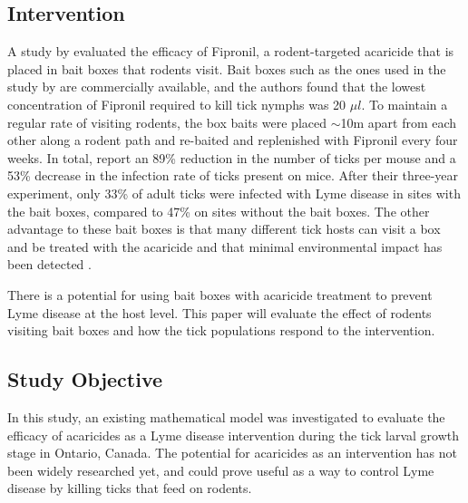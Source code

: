 \documentclass[12pt, centerh1]{article}
\begin{document}
\subsection{Intervention}

A study by \citet{dolan2004control} evaluated the efficacy of Fipronil, a rodent-targeted acaricide that is placed in bait boxes that rodents visit. Bait boxes such as the ones used in the study by \citet{dolan2004control} are commercially available, and the authors found that the lowest concentration of Fipronil required to kill tick nymphs was 20 $\mu l$. To maintain a regular rate of visiting rodents, the box baits were placed $\sim$10m apart from each other along a rodent path and re-baited and replenished with Fipronil every four weeks. In total, \citet{dolan2004control} report an 89\% reduction in the number of ticks per mouse and a 53\% decrease in the infection rate of ticks present on mice. After their three-year experiment, only 33\% of adult ticks were infected with Lyme disease in sites with the bait boxes, compared to 47\% on sites without the bait boxes. The other advantage to these bait boxes is that many different tick hosts can visit a box and be treated with the acaricide and that minimal environmental impact has been detected \citep{dolan2004control}. 

There is a potential for using bait boxes with acaricide treatment to prevent Lyme disease at the host level. This paper will evaluate the effect of rodents visiting bait boxes and how the tick populations respond to the intervention.

\subsection{Study Objective}

In this study, an existing mathematical model was investigated to evaluate the efficacy of acaricides as a Lyme disease intervention during the tick larval growth stage in Ontario, Canada. The potential for acaricides as an intervention has not been widely researched yet, and could prove useful as a way to control Lyme disease by killing ticks that feed on rodents. 
\end{document}
